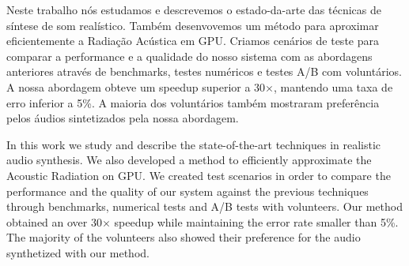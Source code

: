 \resumo
Neste trabalho nós estudamos e descrevemos o estado-da-arte das técnicas de síntese de som realístico.  Também desenvovemos um método para aproximar eficientemente a Radiação Acústica em GPU. Criamos cenários de teste para comparar a performance e a qualidade do nosso sistema com as abordagens anteriores através de benchmarks, testes numéricos e testes A/B com voluntários. A nossa abordagem obteve um speedup superior a 30$\times$, mantendo uma taxa de erro inferior a 5\%. A maioria dos voluntários também mostraram preferência pelos áudios sintetizados pela nossa abordagem.

\abstract
In this work we study and describe the state-of-the-art techniques in realistic audio synthesis. We also developed a method to efficiently approximate the Acoustic Radiation on GPU. We created test scenarios in order to compare the performance and the quality of our system against the previous techniques through benchmarks, numerical tests and A/B tests with volunteers. Our method obtained an over 30$\times$ speedup while maintaining the error rate smaller than 5\%. The majority of the volunteers also showed their preference for the audio synthetized with our method.   
